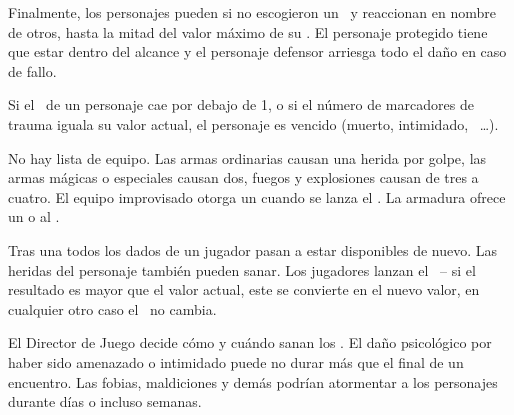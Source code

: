 {		Finalmente, los personajes pueden  si no escogieron un \AD\, y reaccionan en nombre de otros, hasta la mitad del valor máximo de su \RD. El personaje protegido tiene que estar dentro del alcance y el personaje defensor arriesga todo el daño en caso de fallo.

		Si el \HD~de un personaje cae por debajo de 1, o si el número de marcadores de trauma iguala su valor actual, el personaje es vencido (muerto, intimidado, ~\ldots).


		\noindent
		No hay lista de equipo. Las armas ordinarias causan una herida por golpe, las armas mágicas o especiales causan dos, fuegos y explosiones causan de tres a cuatro. El equipo improvisado otorga un  cuando se lanza el \AD. La armadura ofrece un  o  al \RD.


		\noindent
		Tras una  todos los dados de un jugador pasan a estar disponibles de nuevo. Las heridas del personaje también pueden sanar. Los jugadores lanzan el \HD\ -- si el resultado es mayor que el valor actual, este se convierte en el nuevo valor, en cualquier otro caso el \HD\ no cambia.

		El Director de Juego decide cómo y cuándo sanan los . El daño psicológico por haber sido amenazado o intimidado puede no durar más que el final de un encuentro. Las fobias, maldiciones y demás podrían atormentar a los personajes durante días o incluso semanas.
}

